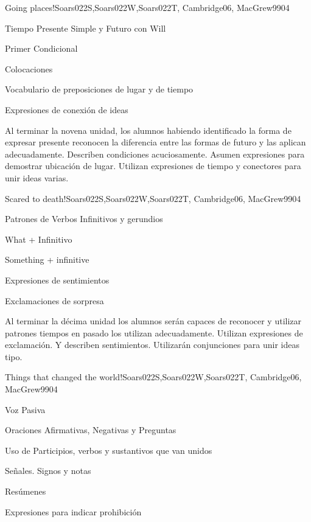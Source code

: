 \begin{syllabus}
\begin{unit}{Going places!}{Soars022S,Soars022W,Soars022T, Cambridge06, MacGrew99}{0}{4}
   \begin{topics}
      \item Tiempo Presente Simple y Futuro con Will
      \item Primer Condicional
      \item Colocaciones
      \item Vocabulario de preposiciones de lugar y de tiempo
      \item Expresiones de conexión de ideas
   \end{topics}

   \begin{learningoutcomes}
      \item Al terminar la novena unidad, los alumnos habiendo identificado la forma de expresar presente reconocen la diferencia entre las formas de futuro y las aplican adecuadamente. Describen condiciones acuciosamente.  Asumen expresiones para demostrar ubicación de lugar. Utilizan expresiones de tiempo y conectores para unir ideas varias.
   \end{learningoutcomes}
\end{unit}

\begin{unit}{Scared to death!}{Soars022S,Soars022W,Soars022T, Cambridge06, MacGrew99}{0}{4}
   \begin{topics}
      \item Patrones de Verbos Infinitivos y gerundios
      \item What + Infinitivo
      \item Something + infinitive
      \item Expresiones de sentimientos
      \item Exclamaciones de sorpresa 
   \end{topics}

   \begin{learningoutcomes}
      \item Al terminar la décima unidad los alumnos serán capaces de reconocer y utilizar patrones tiempos en pasado los utilizan adecuadamente. Utilizan expresiones de exclamación. Y describen sentimientos. Utilizarán conjunciones para unir ideas tipo.
   \end{learningoutcomes}
\end{unit}

\begin{unit}{Things that changed the world!}{Soars022S,Soars022W,Soars022T, Cambridge06, MacGrew99}{0}{4}
   \begin{topics}
      \item Voz Pasiva
      \item Oraciones Afirmativas, Negativas y Preguntas
      \item Uso de Participios, verbos y sustantivos que van unidos
      \item Señales. Signos y notas
      \item Resúmenes
      \item Expresiones para indicar prohibición
   \end{topics}


\end{unit}
\end{syllabus}
